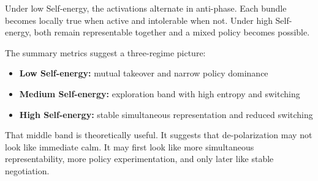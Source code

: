 \documentclass[11pt,a4paper]{article}
\providecommand{\tightlist}{%
  \setlength{\itemsep}{0pt}\setlength{\parskip}{0pt}}
\begin{document}
Under low Self-energy, the activations alternate in anti-phase. Each
bundle becomes locally true when active and intolerable when not. Under
high Self-energy, both remain representable together and a mixed policy
becomes possible.

The summary metrics suggest a three-regime picture:

\begin{itemize}
\tightlist
\item
  \textbf{Low Self-energy:} mutual takeover and narrow policy dominance
\item
  \textbf{Medium Self-energy:} exploration band with high entropy and
  switching
\item
  \textbf{High Self-energy:} stable simultaneous representation and
  reduced switching
\end{itemize}

That middle band is theoretically useful. It suggests that
de-polarization may not look like immediate calm. It may first look like
more simultaneous representability, more policy experimentation, and
only later like stable negotiation.
\end{document}
